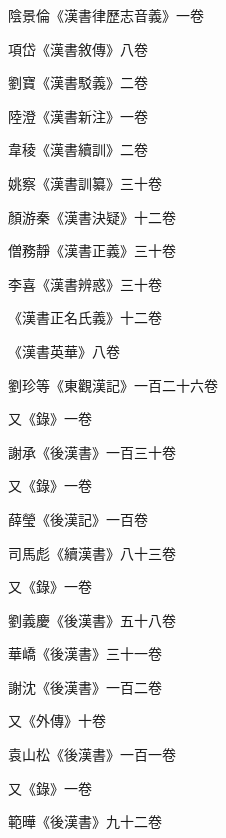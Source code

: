 \begin{pinyinscope}
 陰景倫《漢書律歷志音義》一卷



 項岱《漢書敘傳》八卷



 劉寶《漢書駁義》二卷



 陸澄《漢書新注》一卷



 韋稜《漢書續訓》二卷



 姚察《漢書訓纂》三十卷



 顏游秦《漢書決疑》十二卷



 僧務靜《漢書正義》三十卷



 李喜《漢書辨惑》三十卷



 《漢書正名氏義》十二卷



 《漢書英華》八卷



 劉珍等《東觀漢記》一百二十六卷



 又《錄》一卷



 謝承《後漢書》一百三十卷



 又《錄》一卷



 薛瑩《後漢記》一百卷



 司馬彪《續漢書》八十三卷



 又《錄》一卷



 劉義慶《後漢書》五十八卷



 華嶠《後漢書》三十一卷



 謝沈《後漢書》一百二卷



 又《外傳》十卷



 袁山松《後漢書》一百一卷



 又《錄》一卷



 範曄《後漢書》九十二卷




\end{pinyinscope}
